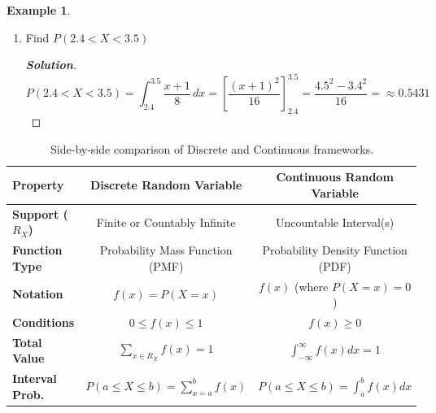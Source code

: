 \documentclass[12pt,a4paper]{report}
\theoremstyle{definition}
\newtheorem{example}[thm]{Example}
\theoremstyle{plain}
\theoremstyle{definition}
\begin{document}
\begin{example}
\begin{enumerate}
\item[(iii).] Find $P(2.4<X<3.5)$
\begin{proof}[\textbf{\textit{Solution}}]
\[P(2.4 < X < 3.5) = \int_{2.4}^{3.5} \frac{x+1}{8} \, dx = \left[ \frac{(x+1)^2}{16} \right]_{2.4}^{3.5} = \frac{4.5^2 - 3.4^2}{16} =  \approx 0.5431\]
\end{proof}
\end{enumerate}
\end{example}


\begin{table}[H]
\centering
\renewcommand{\arraystretch}{2} %
\begin{tabular}{|l|c|c|}
\hline
\textbf{Property} & \textbf{Discrete Random Variable} & \textbf{Continuous Random Variable} \\ \hline
\textbf{Support ($R_X$)} & Finite or Countably Infinite & Uncountable Interval(s) \\ \hline
\textbf{Function Type} & Probability Mass Function (PMF) & Probability Density Function (PDF) \\ \hline
\textbf{Notation} & $f(x) = P(X = x)$ & $f(x)$ (where $P(X=x) = 0$) \\ \hline
\textbf{Conditions} & $0 \leq f(x) \leq 1$ & $f(x) \geq 0$ \\ \hline
\textbf{Total Value} & $\sum_{x \in R_X} f(x) = 1$ & $\int_{-\infty}^{\infty} f(x) dx = 1$ \\ \hline
\textbf{Interval Prob.} & $P(a \le X \le b) = \sum_{x=a}^{b} f(x)$ & $P(a \le X \le b) = \int_{a}^{b} f(x) dx$ \\ \hline
\end{tabular}
\caption{Side-by-side comparison of Discrete and Continuous frameworks.}
\end{table}
\end{document}
